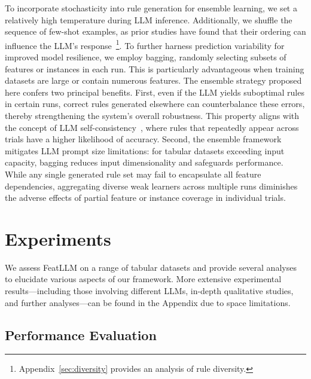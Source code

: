 To incorporate stochasticity into rule generation for ensemble learning, we set a relatively high temperature during LLM inference. Additionally, we shuffle the sequence of few-shot examples, as prior studies have found that their ordering can influence the LLM's response~\cite{lu2022fantastically}\footnote{Appendix~\ref{sec:diversity} provides an analysis of rule diversity.}. To further harness prediction variability for improved model resilience, we employ bagging, randomly selecting subsets of features or instances in each run. This is particularly advantageous when training datasets are large or contain numerous features. The ensemble strategy proposed here confers two principal benefits. First, even if the LLM yields suboptimal rules in certain runs, correct rules generated elsewhere can counterbalance these errors, thereby strengthening the system's overall robustness. This property aligns with the concept of LLM self-consistency~\cite{wang2022self}, where rules that repeatedly appear across trials have a higher likelihood of accuracy. Second, the ensemble framework mitigates LLM prompt size limitations: for tabular datasets exceeding input capacity, bagging reduces input dimensionality and safeguards performance. While any single generated rule set may fail to encapsulate all feature dependencies, aggregating diverse weak learners across multiple runs diminishes the adverse effects of partial feature or instance coverage in individual trials.

\section{Experiments}
We assess \textsf{FeatLLM} on a range of tabular datasets and provide several analyses to elucidate various aspects of our framework. More extensive experimental results—including those involving different LLMs, in-depth qualitative studies, and further analyses—can be found in the Appendix due to space limitations.

\subsection{Performance Evaluation}
